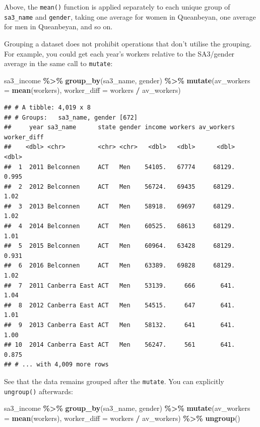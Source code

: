 \documentclass[
]{book}
\newenvironment{Shaded}{\begin{snugshade}}{\end{snugshade}}
\newcommand{\DataTypeTok}[1]{\textcolor[rgb]{0.13,0.29,0.53}{#1}}
\newcommand{\KeywordTok}[1]{\textcolor[rgb]{0.13,0.29,0.53}{\textbf{#1}}}
\newcommand{\NormalTok}[1]{#1}
\newcommand{\OperatorTok}[1]{\textcolor[rgb]{0.81,0.36,0.00}{\textbf{#1}}}
\newcommand{\StringTok}[1]{\textcolor[rgb]{0.31,0.60,0.02}{#1}}
\begin{document}
Above, the \texttt{mean()} function is applied separately to each unique group of \texttt{sa3\_name} and \texttt{gender}, taking one average for women in Queanbeyan, one average for men in Queanbeyan, and so on.

Grouping a dataset does not prohibit operations that don't utilise the grouping. For example, you could get each year's workers relative to the SA3/gender average in the same call to \texttt{mutate}:

\begin{Shaded}
\begin{Highlighting}[]
\NormalTok{sa3\_income }\OperatorTok{\%\textgreater{}\%}\StringTok{ }
\StringTok{  }\KeywordTok{group\_by}\NormalTok{(sa3\_name, gender) }\OperatorTok{\%\textgreater{}\%}\StringTok{ }
\StringTok{  }\KeywordTok{mutate}\NormalTok{(}\DataTypeTok{av\_workers =} \KeywordTok{mean}\NormalTok{(workers),}
         \DataTypeTok{worker\_diff =}\NormalTok{ workers }\OperatorTok{/}\StringTok{ }\NormalTok{av\_workers)}
\end{Highlighting}
\end{Shaded}

\begin{verbatim}
## # A tibble: 4,019 x 8
## # Groups:   sa3_name, gender [672]
##     year sa3_name      state gender income workers av_workers worker_diff
##    <dbl> <chr>         <chr> <chr>   <dbl>   <dbl>      <dbl>       <dbl>
##  1  2011 Belconnen     ACT   Men    54105.   67774     68129.       0.995
##  2  2012 Belconnen     ACT   Men    56724.   69435     68129.       1.02 
##  3  2013 Belconnen     ACT   Men    58918.   69697     68129.       1.02 
##  4  2014 Belconnen     ACT   Men    60525.   68613     68129.       1.01 
##  5  2015 Belconnen     ACT   Men    60964.   63428     68129.       0.931
##  6  2016 Belconnen     ACT   Men    63389.   69828     68129.       1.02 
##  7  2011 Canberra East ACT   Men    53139.     666       641.       1.04 
##  8  2012 Canberra East ACT   Men    54515.     647       641.       1.01 
##  9  2013 Canberra East ACT   Men    58132.     641       641.       1.00 
## 10  2014 Canberra East ACT   Men    56247.     561       641.       0.875
## # ... with 4,009 more rows
\end{verbatim}

See that the data remains grouped after the \texttt{mutate}. You can explicitly \texttt{ungroup()} afterwards:

\begin{Shaded}
\begin{Highlighting}[]
\NormalTok{sa3\_income }\OperatorTok{\%\textgreater{}\%}\StringTok{ }
\StringTok{  }\KeywordTok{group\_by}\NormalTok{(sa3\_name, gender) }\OperatorTok{\%\textgreater{}\%}\StringTok{ }
\StringTok{  }\KeywordTok{mutate}\NormalTok{(}\DataTypeTok{av\_workers =} \KeywordTok{mean}\NormalTok{(workers),}
         \DataTypeTok{worker\_diff =}\NormalTok{ workers }\OperatorTok{/}\StringTok{ }\NormalTok{av\_workers) }\OperatorTok{\%\textgreater{}\%}\StringTok{ }
\StringTok{  }\KeywordTok{ungroup}\NormalTok{()}
\end{Highlighting}
\end{Shaded}
\end{document}
